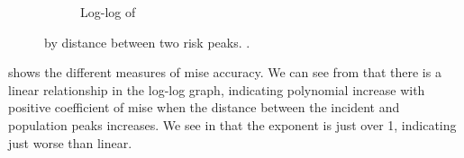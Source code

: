 \begin{figure}[htbp]
\begin{subfigure}[b]{0.49\textwidth}
        \caption{Log-log of }
        \label{fig:ise:p1.4_100_Gap_risk:nmise_log_log}
    \end{subfigure}    
    \caption[ by distance between two risk peaks]
        { by distance between two risk peaks. \errorplotcaption.}
    \label{fig:ise:p1.4_100_Gap_risk}
\end{figure}



 shows the different measures of \gls{mise} accuracy.
We can see from  that there is a linear relationship in the log-log graph,
indicating polynomial increase with positive coefficient of \gls{mise} when the distance between the incident and population peaks increases.
We see in  that the exponent is just over 1,
indicating just worse than linear.

\setpath{}
